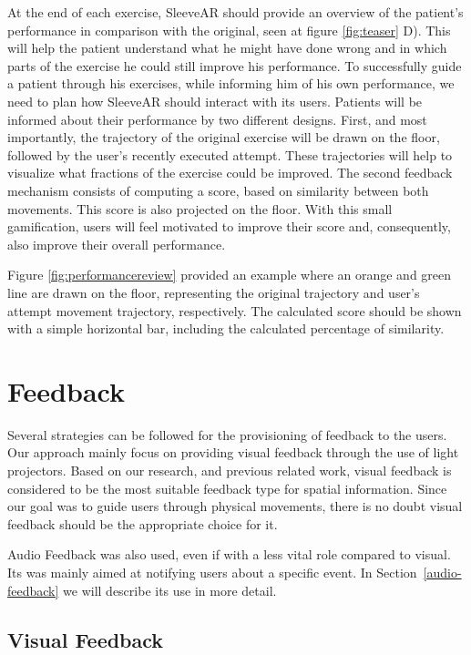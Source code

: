 At the end of each exercise, SleeveAR should provide an overview of the patient's performance in comparison with the original, seen at figure \ref{fig:teaser} D).
This will help the patient understand what he might have done wrong and in which parts of the exercise he could still improve his performance.
To successfully guide a patient through his exercises, while informing him of his own performance, we need to plan how SleeveAR should interact with its users. 
Patients will be informed about their performance by two different designs. 
First, and most importantly, the trajectory of the original exercise will be drawn on the floor, followed by the user's recently executed attempt. 
These trajectories will help to visualize what fractions of the exercise could be improved.
The second feedback mechanism consists of computing a score, based on similarity between both movements. This score is also projected on the floor. 
With this small gamification, users will feel motivated to improve their score and, consequently, also improve their overall performance.

Figure \ref{fig:performancereview} provided an example where an orange and green line are drawn on the floor, representing the original trajectory and user's attempt movement trajectory, respectively. 
The calculated score should be shown with a simple horizontal bar, including the calculated percentage of similarity.


\section{Feedback}
\label{sec:feedback}

Several strategies can be followed for the provisioning of feedback to the users. 
Our approach mainly focus on providing visual feedback through the use of light projectors. 
Based on our research, and previous related work, visual feedback is considered to be the most suitable feedback type for spatial information. 
Since our goal was to guide users through physical movements, there is no doubt visual feedback should be the appropriate choice for it.

Audio Feedback was also used, even if with a less vital role compared to visual.
Its was mainly aimed at notifying users about a specific event. In Section~\ref{audio-feedback} we will describe its use in more detail.


\subsection{Visual Feedback}
\label{vision-feedback}


